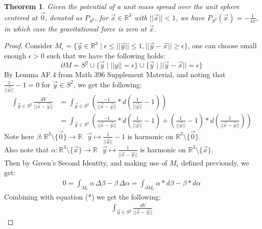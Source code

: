 \documentclass[15pt]{book}
\theoremstyle{break}
\theoremstyle{break}
\newtheorem{thm}{Theorem}[section]
\newtheorem{lem}{Lemma}[thm]
\newcommand{\R}{\mathbb{R}}
\begin{document}

\begin{thm}
Given the potential of a unit mass spread over the unit sphere centered at $\vec{0}$, denoted as $P_{S^2}$, for $\vec{x}\in \R^3$ with $||\vec{x}|| < 1$, we have $P_{S^2}(\vec{x}) =- \frac{1}{4\pi}$, in which case the gravitational force is zero at $\vec{x}$. 
\end{thm}
\begin{proof}
Consider $M_{\epsilon}=\{ \vec{y}\in \R^3 \mid \epsilon \leq ||\vec{y}|| \leq 1, ||\vec{y}-\vec{x}||\geq \epsilon\}$, one can choose small enough $\epsilon >0$ such that we have the following holds:
$$\partial M = S^2 \cup \{\vec{y}\mid ||y|| = \epsilon\} \cup \{\vec{y}\mid ||\vec{y}- \vec{x}|| = \epsilon\}$$
By Lemma AF.4 from Math 396 Supplement Material, and noting that $\frac{1}{||\vec{y}||}-1 = 0$ for $\vec{y}\in S^2$, we get the following:
\begin{align*}
\int_{\vec{y}\in S^2}\frac{dV}{||\vec{x}-\vec{y}||} &= \int_{\vec{y}\in S^2}\left(\frac{-1}{||\vec{x}-\vec{y}||}*d\left(\frac{1}{||\vec{y}||}-1\right) \right)\\
&=\int_{\vec{y}\in S^2}\left(\frac{-1}{||\vec{x}-\vec{y}||}*d\left(\frac{1}{||\vec{y}||}-1\right) + \left( \frac{1}{||\vec{y}||} - 1\right) *d\left( \frac{1}{||\vec{x}-\vec{y}||}\right)\right) \tag{*}
\end{align*}
Note here $\beta: \R^3 \setminus \{\vec{0}\} \to \R \ \ \ \vec{y}\mapsto\frac{1}{||\vec{y}||} - 1$ is harmonic on $\R^3 \setminus \{\vec{0}\}$. \\
Also note that $\alpha: \R^3 \setminus \{\vec{x}\} \to \R \ \ \ \vec{y}\mapsto\frac{1}{||\vec{x}-\vec{y}||}$ is harmonic on $\R^3 \setminus \{\vec{x}\}$.\\ 
Then by Green's Second Identity, and making use of $M_\epsilon$ defined previously, we get:
\begin{align*}
0 = \int_{M_\epsilon} \alpha\, \Delta \beta  - \beta\, \Delta \alpha  =\int_{\partial {M_\epsilon}} \alpha * d\beta  - \beta * d\alpha 
\end{align*}
Combining with equation (*) we get the following:
\begin{align*}
\int_{\vec{y}\in S^2}\frac{dV}{||\vec{x}-\vec{y}||} 

\end{align*}
\end{proof}
\end{document}
